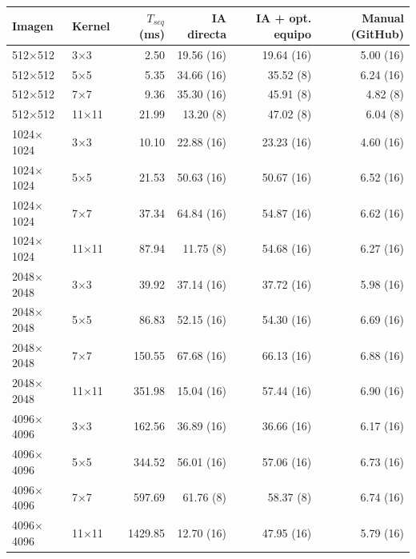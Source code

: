 \begin{tabular}{llrrrr}
\toprule
Imagen & Kernel & $T_{seq}$ (ms) & IA directa & IA + opt. equipo & Manual (GitHub) \\
\midrule
512$\times$512 & 3$\times$3 & 2.50 & 19.56 (16) & 19.64 (16) & 5.00 (16) \\
512$\times$512 & 5$\times$5 & 5.35 & 34.66 (16) & 35.52 (8) & 6.24 (16) \\
512$\times$512 & 7$\times$7 & 9.36 & 35.30 (16) & 45.91 (8) & 4.82 (8) \\
512$\times$512 & 11$\times$11 & 21.99 & 13.20 (8) & 47.02 (8) & 6.04 (8) \\
1024$\times$1024 & 3$\times$3 & 10.10 & 22.88 (16) & 23.23 (16) & 4.60 (16) \\
1024$\times$1024 & 5$\times$5 & 21.53 & 50.63 (16) & 50.67 (16) & 6.52 (16) \\
1024$\times$1024 & 7$\times$7 & 37.34 & 64.84 (16) & 54.87 (16) & 6.62 (16) \\
1024$\times$1024 & 11$\times$11 & 87.94 & 11.75 (8) & 54.68 (16) & 6.27 (16) \\
2048$\times$2048 & 3$\times$3 & 39.92 & 37.14 (16) & 37.72 (16) & 5.98 (16) \\
2048$\times$2048 & 5$\times$5 & 86.83 & 52.15 (16) & 54.30 (16) & 6.69 (16) \\
2048$\times$2048 & 7$\times$7 & 150.55 & 67.68 (16) & 66.13 (16) & 6.88 (16) \\
2048$\times$2048 & 11$\times$11 & 351.98 & 15.04 (16) & 57.44 (16) & 6.90 (16) \\
4096$\times$4096 & 3$\times$3 & 162.56 & 36.89 (16) & 36.66 (16) & 6.17 (16) \\
4096$\times$4096 & 5$\times$5 & 344.52 & 56.01 (16) & 57.06 (16) & 6.73 (16) \\
4096$\times$4096 & 7$\times$7 & 597.69 & 61.76 (8) & 58.37 (8) & 6.74 (16) \\
4096$\times$4096 & 11$\times$11 & 1429.85 & 12.70 (16) & 47.95 (16) & 5.79 (16) \\
\bottomrule
\end{tabular}
